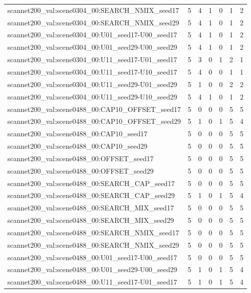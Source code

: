 \begin{table}[t]
\begin{tabular}{lrrrrrr}
scannet200\_val:scene0304\_00:SEARCH\_NMIX\_seed17 & 5 & 4 & 1 & 0 & 1 & 2 \\
scannet200\_val:scene0304\_00:SEARCH\_NMIX\_seed29 & 5 & 4 & 1 & 0 & 1 & 2 \\
scannet200\_val:scene0304\_00:U01\_seed17-U00\_seed17 & 5 & 4 & 1 & 0 & 1 & 2 \\
scannet200\_val:scene0304\_00:U01\_seed29-U00\_seed29 & 5 & 4 & 1 & 0 & 1 & 2 \\
scannet200\_val:scene0304\_00:U11\_seed17-U01\_seed17 & 5 & 3 & 0 & 1 & 2 & 1 \\
scannet200\_val:scene0304\_00:U11\_seed17-U10\_seed17 & 5 & 4 & 0 & 0 & 1 & 1 \\
scannet200\_val:scene0304\_00:U11\_seed29-U01\_seed29 & 5 & 1 & 0 & 0 & 2 & 2 \\
scannet200\_val:scene0304\_00:U11\_seed29-U10\_seed29 & 5 & 4 & 1 & 0 & 1 & 2 \\
scannet200\_val:scene0488\_00:CAP10\_OFFSET\_seed17 & 5 & 0 & 0 & 0 & 5 & 5 \\
scannet200\_val:scene0488\_00:CAP10\_OFFSET\_seed29 & 5 & 1 & 0 & 1 & 5 & 4 \\
scannet200\_val:scene0488\_00:CAP10\_seed17 & 5 & 0 & 0 & 0 & 5 & 5 \\
scannet200\_val:scene0488\_00:CAP10\_seed29 & 5 & 0 & 0 & 0 & 5 & 5 \\
scannet200\_val:scene0488\_00:OFFSET\_seed17 & 5 & 0 & 0 & 0 & 5 & 5 \\
scannet200\_val:scene0488\_00:OFFSET\_seed29 & 5 & 0 & 0 & 0 & 5 & 5 \\
scannet200\_val:scene0488\_00:SEARCH\_CAP\_seed17 & 5 & 0 & 0 & 0 & 5 & 5 \\
scannet200\_val:scene0488\_00:SEARCH\_CAP\_seed29 & 5 & 1 & 0 & 1 & 5 & 4 \\
scannet200\_val:scene0488\_00:SEARCH\_MIX\_seed17 & 5 & 0 & 0 & 0 & 5 & 5 \\
scannet200\_val:scene0488\_00:SEARCH\_MIX\_seed29 & 5 & 0 & 0 & 0 & 5 & 5 \\
scannet200\_val:scene0488\_00:SEARCH\_NMIX\_seed17 & 5 & 0 & 0 & 0 & 5 & 5 \\
scannet200\_val:scene0488\_00:SEARCH\_NMIX\_seed29 & 5 & 0 & 0 & 0 & 5 & 5 \\
scannet200\_val:scene0488\_00:U01\_seed17-U00\_seed17 & 5 & 0 & 0 & 0 & 5 & 5 \\
scannet200\_val:scene0488\_00:U01\_seed29-U00\_seed29 & 5 & 1 & 0 & 1 & 5 & 4 \\
scannet200\_val:scene0488\_00:U11\_seed17-U01\_seed17 & 5 & 1 & 0 & 1 & 5 & 4 \\

\end{tabular}
\end{table}
